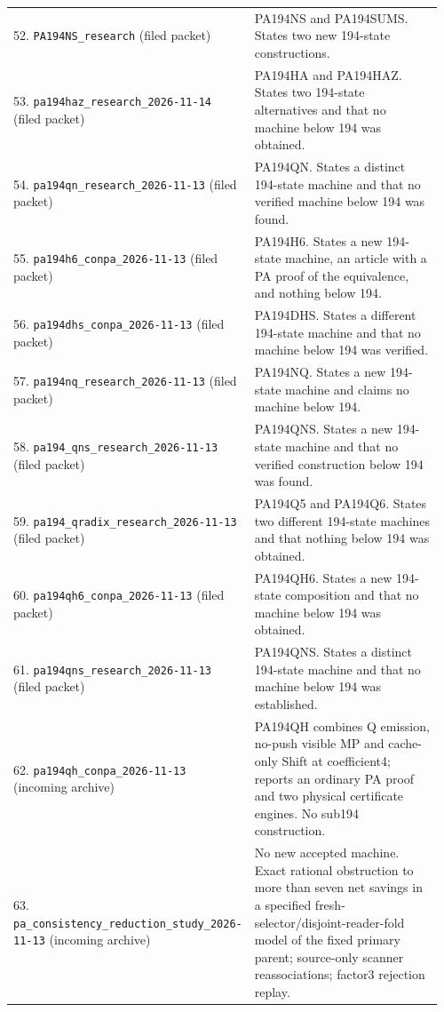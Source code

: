 \begin{longtable}{@{}p{0.35\linewidth}p{0.61\linewidth}@{}}
52. \nolinkurl{PA194NS_research} (filed packet) & PA194NS and PA194SUMS. States two new 194-state constructions.\\[5pt]
53. \nolinkurl{pa194haz_research_2026-11-14} (filed packet) & PA194HA and PA194HAZ. States two 194-state alternatives and that no machine below 194 was obtained.\\[5pt]
54. \nolinkurl{pa194qn_research_2026-11-13} (filed packet) & PA194QN. States a distinct 194-state machine and that no verified machine below 194 was found.\\[5pt]
55. \nolinkurl{pa194h6_conpa_2026-11-13} (filed packet) & PA194H6. States a new 194-state machine, an article with a PA proof of the equivalence, and nothing below 194.\\[5pt]
56. \nolinkurl{pa194dhs_conpa_2026-11-13} (filed packet) & PA194DHS. States a different 194-state machine and that no machine below 194 was verified.\\[5pt]
57. \nolinkurl{pa194nq_research_2026-11-13} (filed packet) & PA194NQ. States a new 194-state machine and claims no machine below 194.\\[5pt]
58. \nolinkurl{pa194_qns_research_2026-11-13} (filed packet) & PA194QNS. States a new 194-state machine and that no verified construction below 194 was found.\\[5pt]
59. \nolinkurl{pa194_qradix_research_2026-11-13} (filed packet) & PA194Q5 and PA194Q6. States two different 194-state machines and that nothing below 194 was obtained.\\[5pt]
60. \nolinkurl{pa194qh6_conpa_2026-11-13} (filed packet) & PA194QH6. States a new 194-state composition and that no machine below 194 was obtained.\\[5pt]
61. \nolinkurl{pa194qns_research_2026-11-13} (filed packet) & PA194QNS. States a distinct 194-state machine and that no machine below 194 was established.\\[5pt]
62. \nolinkurl{pa194qh_conpa_2026-11-13} (incoming archive) & PA194QH combines Q emission, no-push visible MP and cache-only Shift at coefficient4; reports an ordinary PA proof and two physical certificate engines. No sub194 construction.\\[5pt]
63. \nolinkurl{pa_consistency_reduction_study_2026-11-13} (incoming archive) & No new accepted machine. Exact rational obstruction to more than seven net savings in a specified fresh-selector/disjoint-reader-fold model of the fixed primary parent; source-only scanner reassociations; factor3 rejection replay.\\[5pt]

\end{longtable}
